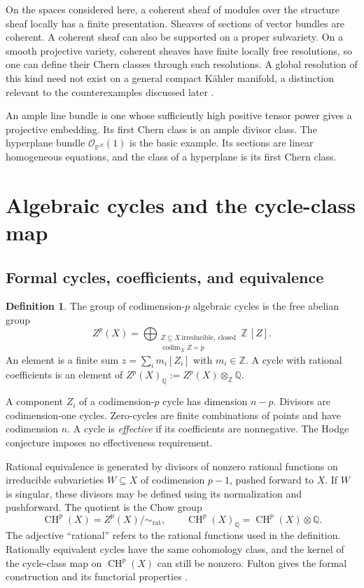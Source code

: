 \documentclass[11pt,reqno]{amsart}
\theoremstyle{definition}
\newtheorem{definition}[theorem]{Definition}
\theoremstyle{remark}
\numberwithin{equation}{section}
\newcommand{\Z}{\mathbb{Z}}
\newcommand{\Q}{\mathbb{Q}}
\newcommand{\PP}{\mathbb{P}}
\newcommand{\OO}{\mathcal{O}}
\DeclareMathOperator{\CH}{CH}
\begin{document}
On the spaces considered here, a coherent sheaf of modules over the
structure sheaf locally has a finite presentation. Sheaves of sections of
vector bundles are coherent. A coherent sheaf can also be supported on a
proper subvariety. On a smooth projective variety, coherent sheaves have finite
locally free resolutions, so one can define their Chern classes through
such resolutions. A global resolution of this kind need not exist on a
general compact K\"ahler manifold, a distinction relevant to the
counterexamples discussed later \cite{voisin2002kahler}.

An ample line bundle is one whose sufficiently high positive tensor
power gives a projective embedding. Its first Chern class is an
ample divisor class. The hyperplane bundle $\OO_{\PP^N}(1)$ is the
basic example. Its sections are linear homogeneous equations, and the
class of a hyperplane is its first Chern class.

\section{Algebraic cycles and the cycle-class map}\label{sec:cycles}

\subsection{Formal cycles, coefficients, and equivalence}

\begin{definition}
The group of codimension-$p$ algebraic cycles is the free abelian group
\[
 Z^p(X)=\bigoplus_{\substack{Z\subseteq X\ \mathrm{irreducible,\ closed}\\
                              \operatorname{codim}_X Z=p}}\Z\,[Z].
\]
An element is a finite sum $z=\sum_i m_i[Z_i]$ with $m_i\in\Z$.
A cycle with rational coefficients is an element of
$Z^p(X)_{\Q}:=Z^p(X)\otimes_{\Z}\Q$.
\end{definition}

A component $Z_i$ of a codimension-$p$ cycle has dimension $n-p$.
Divisors are codimension-one cycles. Zero-cycles are finite combinations
of points and have codimension $n$. A cycle is \emph{effective} if its
coefficients are nonnegative. The Hodge conjecture imposes no effectiveness
requirement.

Rational equivalence is generated by divisors of nonzero rational functions
on irreducible subvarieties $W\subseteq X$ of codimension $p-1$, pushed
forward to $X$. If $W$ is singular, these divisors may be defined using its
normalization and pushforward. The quotient is the Chow group
\[
 \CH^p(X)=Z^p(X)/\!\sim_{\mathrm{rat}},
 \qquad \CH^p(X)_{\Q}=\CH^p(X)\otimes\Q.
\]
The adjective ``rational'' refers to the rational functions used in the
definition. Rationally equivalent cycles have the same cohomology class, and
the kernel of the cycle-class map on $\CH^p(X)$ can still be nonzero. Fulton
gives the formal construction and its functorial properties \cite{fulton1998}.
\end{document}
